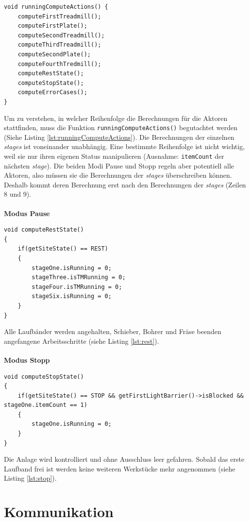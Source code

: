 \documentclass[fontsize=11pt,a4paper,final]{scrartcl}[2003/01/01]
\begin{document}
\begin{lstlisting}[caption={Die Funktion \lstinline|runningComputeActions|},label={lst:runningComputeActions}]
void runningComputeActions() {
	computeFirstTreadmill();
	computeFirstPlate();
	computeSecondTreadmill();
	computeThirdTreadmill();
	computeSecondPlate();
	computeFourthTredmill();
	computeRestState();
	computeStopState();
	computeErrorCases();
}
\end{lstlisting}
Um zu verstehen, in welcher Reihenfolge die Berechnungen für die Aktoren stattfinden, muss die Funktion \lstinline|runningComputeActions()| begutachtet werden (Siehe Listing \ref{lst:runningComputeActions}). Die Berechnungen der einzelnen \textit{stages} ist voneinander unabhängig. Eine bestimmte Reihenfolge ist nicht wichtig, weil sie nur ihren eigenen Status manipulieren (Ausnahme: \lstinline|itemCount| der nächsten \textit{stage}). Die beiden Modi Pause und Stopp regeln aber potentiell alle Aktoren, also müssen sie die Berechnungen der \textit{stages} überschreiben können. Deshalb kommt deren Berechnung erst nach den Berechnungen der \textit{stages} (Zeilen 8 und 9). \\ \\
\textbf{Modus Pause}
\begin{lstlisting}[caption={Die Pause Funktion},label={lst:rest}]
void computeRestState()
{
	if(getSiteState() == REST)
	{
		stageOne.isRunning = 0;
		stageThree.isTMRunning = 0;
		stageFour.isTMRunning = 0;
		stageSix.isRunning = 0;
	}
}
\end{lstlisting}
Alle Laufbänder werden angehalten, Schieber, Bohrer und Fräse beenden angefangene Arbeitsschritte (siehe Listing \ref{lst:rest}). \\ \\
\textbf{Modus Stopp}
\begin{lstlisting}[caption={Die Stopp Funktion},label={lst:stop}]
void computeStopState()
{
	if(getSiteState() == STOP && getFirstLightBarrier()->isBlocked && stageOne.itemCount == 1)
	{
		stageOne.isRunning = 0;
	}
}
\end{lstlisting}
Die Anlage wird kontrolliert und ohne Ausschluss leer gefahren. Sobald das erste Laufband frei ist werden keine weiteren Werkstücke mehr angenommen (siehe Listing \ref{lst:stop}).
\section{Kommunikation}
\end{document}
